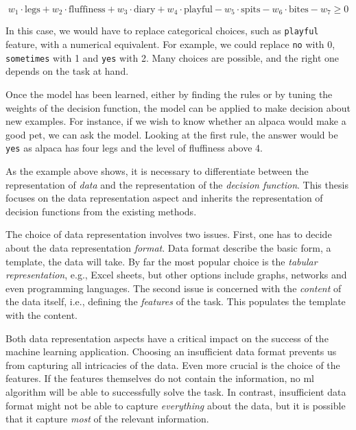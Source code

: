 $$ w_1 \cdot \text{legs} + w_2 \cdot \text{fluffiness} + w_3 \cdot \text{diary} + w_4 \cdot \text{playful} - w_5 \cdot \text{spits} - w_6 \cdot \text{bites} - w_7 \geq 0$$

In this case, we would have to replace categorical choices, such as \texttt{playful} feature, with a numerical equivalent.
For example, we could replace \texttt{no} with 0, \texttt{sometimes} with 1 and \texttt{yes} with 2.
Many choices are possible, and the right one depends on the task at hand.


Once the model has been learned, either by finding the rules or by tuning the weights of the decision function, the model can be applied to make decision about new examples.
For instance, if we wish to know whether an alpaca would make a good pet, we can ask the model.
Looking at the first rule, the answer would be \texttt{yes} as alpaca has four legs and the level of fluffiness above 4. 



As the example above shows, it is necessary to differentiate between the representation of \textit{data} and the representation of  the \textit{decision function}.
This thesis focuses on the data representation aspect and inherits the representation of decision functions from the existing methods.





The choice of data representation involves two issues.
First, one has to decide about the data representation \textit{format}.
Data format describe the basic form, a template, the data will take.
By far the most popular choice is the \textit{tabular representation}, e.g., Excel sheets, but other options include graphs, networks and even programming languages.
The second issue is concerned with the \textit{content} of the data itself, i.e., defining the \textit{features} of the task.
This populates the template with the content.



Both data representation aspects have a critical impact on the success of the machine learning application.
Choosing an insufficient data format prevents us from capturing all intricacies of the data.
Even more crucial is the choice of the features.
If the features themselves do not contain the information, no \gls{ml} algorithm will be able to successfully solve the task.
In contrast, insufficient data format might not be able to capture \textit{everything} about the data, but it is possible that it capture \textit{most} of the relevant information.



